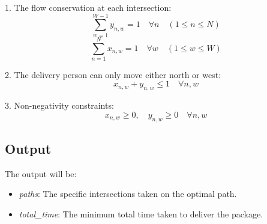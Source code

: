 \documentclass{article}
\begin{document}
1. The flow conservation at each intersection:
\[
\sum_{w=1}^{W-1} y_{n,w} = 1 \quad \forall n \quad (1 \leq n \leq N)
\]
\[
\sum_{n=1}^{N} x_{n,w} = 1 \quad \forall w \quad (1 \leq w \leq W)
\]

2. The delivery person can only move either north or west:
\[
x_{n,w} + y_{n,w} \leq 1 \quad \forall n, w
\]

3. Non-negativity constraints:
\[
x_{n,w} \geq 0, \quad y_{n,w} \geq 0 \quad \forall n, w
\]

\subsection*{Output}

The output will be:
\begin{itemize}
    \item \textit{paths}: The specific intersections taken on the optimal path.
    \item \textit{total\_time}: The minimum total time taken to deliver the package.
\end{itemize}
\end{document}
